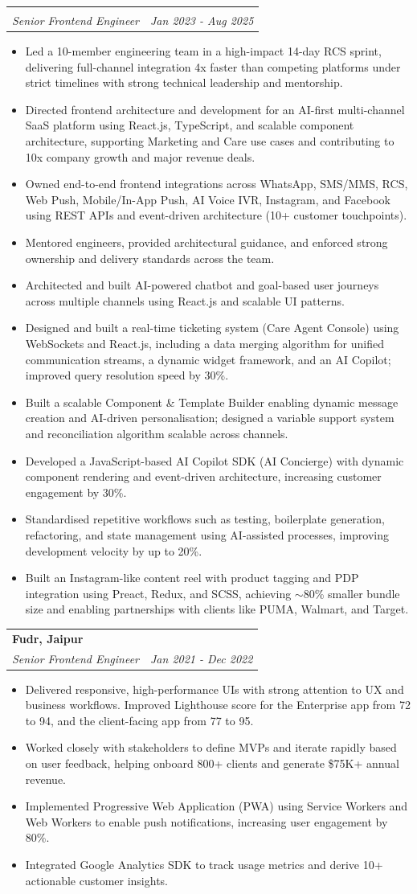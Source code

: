 \documentclass[letterpaper,11pt]{article}
\makeatletter
\newcommand{\resumeItem}[1]{\item \small{#1}}
\newcommand{\resumeSubheading}[4]{
  \vspace{-2pt}\item
  \begin{tabular*}{0.97\textwidth}[t]{l@{\extracolsep{\fill}}r}
    \textbf{#1} & #2 \\
    \textit{\small#3} & \textit{\small #4} \\
  \end{tabular*}\vspace{-6pt}
}
\newcommand{\resumeItemListStart}{\begin{itemize}[leftmargin=0.2in, label=\textbullet]}
\newcommand{\resumeItemListEnd}{\end{itemize}\vspace{-5pt}}
\makeatother
\begin{document}
\resumeSubheading
{}{ }{Senior Frontend Engineer}{Jan 2023 - Aug 2025}
\resumeItemListStart
\resumeItem{Led a 10-member engineering team in a high-impact 14-day RCS sprint, delivering full-channel integration 4x faster than competing platforms under strict timelines with strong technical leadership and mentorship.}
\resumeItem{Directed frontend architecture and development for an AI-first multi-channel SaaS platform using React.js, TypeScript, and scalable component architecture, supporting Marketing and Care use cases and contributing to 10x company growth and major revenue deals.}
\resumeItem{Owned end-to-end frontend integrations across WhatsApp, SMS/MMS, RCS, Web Push, Mobile/In-App Push, AI Voice IVR, Instagram, and Facebook using REST APIs and event-driven architecture (10+ customer touchpoints).}
\resumeItem{Mentored engineers, provided architectural guidance, and enforced strong ownership and delivery standards across the team.}
\resumeItem{Architected and built AI-powered chatbot and goal-based user journeys across multiple channels using React.js and scalable UI patterns.}
\resumeItem{Designed and built a real-time ticketing system (Care Agent Console) using WebSockets and React.js, including a data merging algorithm for unified communication streams, a dynamic widget framework, and an AI Copilot; improved query resolution speed by 30\%.}
\resumeItem{Built a scalable Component \& Template Builder enabling dynamic message creation and AI-driven personalisation; designed a variable support system and reconciliation algorithm scalable across channels.}
\resumeItem{Developed a JavaScript-based AI Copilot SDK (AI Concierge) with dynamic component rendering and event-driven architecture, increasing customer engagement by 30\%.}
\resumeItem{Standardised repetitive workflows such as testing, boilerplate generation, refactoring, and state management using AI-assisted processes, improving development velocity by up to 20\%.}
\resumeItem{Built an Instagram-like content reel with product tagging and PDP integration using Preact, Redux, and SCSS, achieving $\sim$80\% smaller bundle size and enabling partnerships with clients like PUMA, Walmart, and Target.}
\resumeItemListEnd

\resumeSubheading
{Fudr, Jaipur}{}{Senior Frontend Engineer}{Jan 2021 - Dec 2022}
\resumeItemListStart
\resumeItem{Delivered responsive, high-performance UIs with strong attention to UX and business workflows. Improved Lighthouse score for the Enterprise app from 72 to 94, and the client-facing app from 77 to 95.}
\resumeItem{Worked closely with stakeholders to define MVPs and iterate rapidly based on user feedback, helping onboard 800+ clients and generate \$75K+ annual revenue.}
\resumeItem{Implemented Progressive Web Application (PWA) using Service Workers and Web Workers to enable push notifications, increasing user engagement by 80\%.}
\resumeItem{Integrated Google Analytics SDK to track usage metrics and derive 10+ actionable customer insights.}
\resumeItemListEnd
\end{document}
